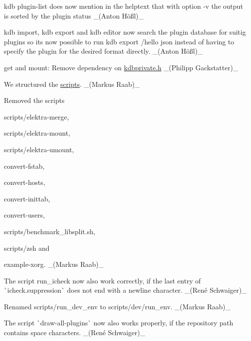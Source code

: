 \begin{DoxyItemize}
\item {\ttfamily kdb plugin-\/list} does now mention in the helptext that with option {\ttfamily -\/v} the output is sorted by the plugin status \+\_\+(Anton Hößl)\+\_\+
\item {\ttfamily kdb import}, {\ttfamily kdb export} and {\ttfamily kdb editor} now search the plugin database for suitig plugins so it\textquotesingle{}s now possible to run {\ttfamily kdb export /hello json} instead of having to specify the plugin for the desired format directly. \+\_\+(Anton Hößl)\+\_\+
\item {\ttfamily get} and {\ttfamily mount}\+: Remove dependency on {\ttfamily \mbox{\hyperlink{kdbprivate_8h}{kdbprivate.\+h}}} \+\_\+(\+Philipp Gackstatter)\+\_\+
\end{DoxyItemize}


\begin{DoxyItemize}
\item We structured the \mbox{\hyperlink{scripts_README_md}{scripts}}. \+\_\+(\+Markus Raab)\+\_\+
\item Removed the scripts
\begin{DoxyItemize}
\item {\ttfamily scripts/elektra-\/merge},
\item {\ttfamily scripts/elektra-\/mount},
\item {\ttfamily scripts/elektra-\/umount},
\item {\ttfamily convert-\/fstab},
\item {\ttfamily convert-\/hosts},
\item {\ttfamily convert-\/inittab},
\item {\ttfamily convert-\/users},
\item {\ttfamily scripts/benchmark\+\_\+libsplit.\+sh},
\item {\ttfamily scripts/zsh} and
\item {\ttfamily example-\/xorg}. \+\_\+(\+Markus Raab)\+\_\+
\end{DoxyItemize}
\item The script run\+\_\+icheck now also work correctly, if the last entry of \`{}icheck.suppression\`{} does not end with a newline character. \+\_\+(René Schwaiger)\+\_\+
\item Renamed {\ttfamily scripts/run\+\_\+dev\+\_\+env} to {\ttfamily scripts/dev/run\+\_\+env}. \+\_\+(\+Markus Raab)\+\_\+
\item The script \`{}draw-\/all-\/plugins\`{} now also works properly, if the repository path contains space characters. \+\_\+(René Schwaiger)\+\_\+

\end{DoxyItemize}

